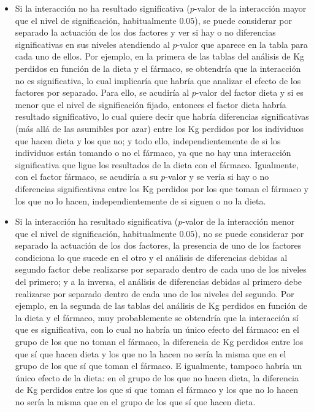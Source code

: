 \documentclass[
  a4paper,
]{scrreport}
\theoremstyle{plain}
\theoremstyle{definition}
\theoremstyle{definition}
\theoremstyle{remark}
\begin{document}
\begin{itemize}
\item
  Si la interacción no ha resultado significativa (\(p\)-valor de la
  interacción mayor que el nivel de significación, habitualmente
  \(0.05\)), se puede considerar por separado la actuación de los dos
  factores y ver si hay o no diferencias significativas en sus niveles
  atendiendo al \(p\)-valor que aparece en la tabla para cada uno de
  ellos. Por ejemplo, en la primera de las tablas del análisis de Kg
  perdidos en función de la dieta y el fármaco, se obtendría que la
  interacción no es significativa, lo cual implicaría que habría que
  analizar el efecto de los factores por separado. Para ello, se
  acudiría al \(p\)-valor del factor dieta y si es menor que el nivel de
  significación fijado, entonces el factor dieta habría resultado
  significativo, lo cual quiere decir que habría diferencias
  significativas (más allá de las asumibles por azar) entre los Kg
  perdidos por los individuos que hacen dieta y los que no; y todo ello,
  independientemente de si los individuos están tomando o no el fármaco,
  ya que no hay una interacción significativa que ligue los resultados
  de la dieta con el fármaco. Igualmente, con el factor fármaco, se
  acudiría a su \(p\)-valor y se vería si hay o no diferencias
  significativas entre los Kg perdidos por los que toman el fármaco y
  los que no lo hacen, independientemente de si siguen o no la dieta.
\item
  Si la interacción ha resultado significativa (\(p\)-valor de la
  interacción menor que el nivel de significación, habitualmente
  \(0.05\)), no se puede considerar por separado la actuación de los dos
  factores, la presencia de uno de los factores condiciona lo que sucede
  en el otro y el análisis de diferencias debidas al segundo factor debe
  realizarse por separado dentro de cada uno de los niveles del primero;
  y a la inversa, el análisis de diferencias debidas al primero debe
  realizarse por separado dentro de cada uno de los niveles del segundo.
  Por ejemplo, en la segunda de las tablas del análisis de Kg perdidos
  en función de la dieta y el fármaco, muy probablemente se obtendría
  que la interacción sí que es significativa, con lo cual no habría un
  único efecto del fármaco: en el grupo de los que no toman el fármaco,
  la diferencia de Kg perdidos entre los que sí que hacen dieta y los
  que no la hacen no sería la misma que en el grupo de los que sí que
  toman el fármaco. E igualmente, tampoco habría un único efecto de la
  dieta: en el grupo de los que no hacen dieta, la diferencia de Kg
  perdidos entre los que sí que toman el fármaco y los que no lo hacen
  no sería la misma que en el grupo de los que sí que hacen dieta.
\end{itemize}
\end{document}
